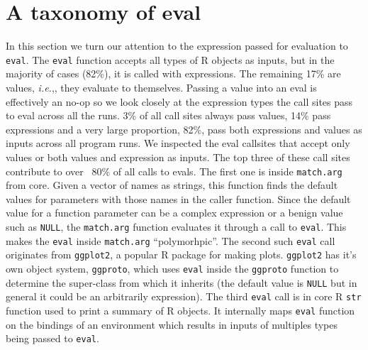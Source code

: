 \documentclass[USenglish,cleveref, autoref, thm-restate]{lipics-v2019}
\newcommand{\AllValueInputEvalCallPerc}{17\%\xspace}
\newcommand{\AllExpressionInputEvalCallPerc}{82\%\xspace}
\newcommand{\AllExpressionInputEvalSitePerc}{14\%\xspace}
\newcommand{\AllValueInputEvalSitePerc}{3\%\xspace}
\newcommand{\AllPolymorphicInputEvalSitePerc}{82\%\xspace}
\newcommand{\ie}{\emph{i.e.},\xspace}
\newcommand{\eval}{\texttt{eval}\xspace}
\newcommand{\ggproto}{\c{ggproto}}
\newcommand{\ggplot}{\c{ggplot2}}
\renewcommand{\c}[1]{\lstinline{#1}\xspace}
\begin{document}
\section{A taxonomy of eval}


In this section we turn our attention to the expression passed for evaluation to
\eval. The \eval function accepts all types of R objects as inputs, but in the
majority of cases (\AllExpressionInputEvalCallPerc), it is called with
expressions. The remaining \AllValueInputEvalCallPerc are values, \ie, they
evaluate to themselves.
%
Passing a value into an eval is effectively an no-op so we look closely at the
expression types the call sites pass to eval across all the runs.
\AllValueInputEvalSitePerc of all call sites always pass values,
\AllExpressionInputEvalSitePerc pass expressions and a very large proportion,
\AllPolymorphicInputEvalSitePerc, pass both expressions and values as inputs
across all program runs. We inspected the eval callsites that accept only values
or both values and expression as inputs. The top three of these call sites
contribute to over ~80\% of all calls to evals. The first one is inside
\c{match.arg} from core. Given a vector of names as strings, this function finds
the default values for parameters with those names in the caller function. Since
the default value for a function parameter can be a complex expression or a
benign value such as \c{NULL}, the \c{match.arg} function evaluates it through a
call to \eval. This makes the \eval inside \c{match.arg} ``polymorhpic''. The
second such \eval call originates from \ggplot, a popular R package for making
plots. \ggplot has it's own object system, \ggproto, which uses \eval inside the
\ggproto function to determine the super-class from which it inherits (the
default value is \c{NULL} but in general it could be an arbitrarily expression).
The third \eval call is in core R \c{str} function used to print a summary of R
objects. It internally maps \eval function on the bindings of an environment
which results in inputs of multiples types being passed to \eval.
\end{document}
